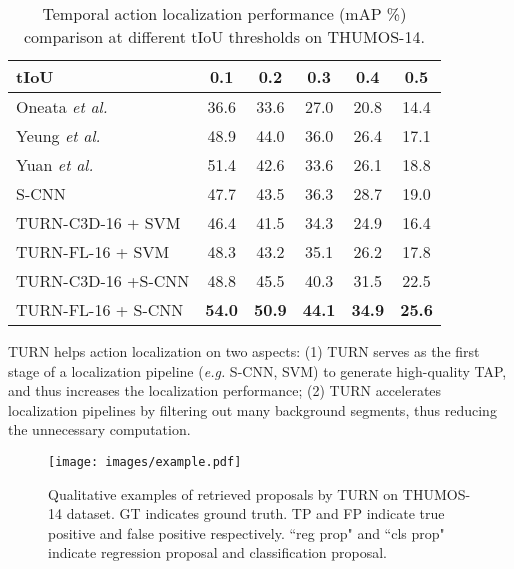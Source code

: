 \documentclass[10pt,twocolumn,letterpaper]{article}
\begin{document}
\begin{table}[h]\small
\centering
\caption{Temporal action localization performance (mAP \%) comparison at different tIoU thresholds on THUMOS-14.}
\label{diff iou tbl}
\begin{tabular}{l|ccccc}
\hline
tIoU     & 0.1           & 0.2           & 0.3           & 0.4           & 0.5           \\ \hline
Oneata \emph{et al.}\cite{oneata2014lear} & 36.6          & 33.6          & 27.0          & 20.8          & 14.4          \\ 
Yeung \emph{et al.}\cite{Yeung_2016_CVPR}  & 48.9          & 44.0          & 36.0          & 26.4          & 17.1          \\ 
Yuan \emph{et al.} \cite{Yuan_2016_CVPR}  & 51.4          & 42.6          & 33.6          & 26.1          & 18.8          \\ 
S-CNN \cite{Shou_2016_CVPR}         & 47.7          & 43.5          & 36.3          & 28.7          & 19.0          \\ \hline
TURN-C3D-16 + SVM            & 46.4      & 41.5          & 34.3          & 24.9          & 16.4       \\ 
TURN-FL-16 + SVM            & 48.3      & 43.2          & 35.1          & 26.2          & 17.8       \\ 
TURN-C3D-16 +S-CNN          & 48.8      & 45.5          & 40.3          & 31.5          & 22.5 \\ 
TURN-FL-16 + S-CNN               & \textbf{54.0} & \textbf{50.9} & \textbf{44.1} & \textbf{34.9} & \textbf{25.6}\\ \hline
\end{tabular}
\end{table}

TURN helps action localization on two aspects: (1) TURN serves as the first stage of a localization pipeline (\emph{e.g.} S-CNN, SVM) to generate high-quality TAP, and thus increases the localization performance; (2) TURN accelerates localization pipelines by filtering out many background segments, thus reducing the unnecessary computation.

\begin{figure}[]

  \centering
    \texttt{[image: images/example.pdf]}
    \caption{Qualitative examples of retrieved proposals by TURN on THUMOS-14 dataset. GT indicates ground truth. TP and FP indicate true positive and false positive respectively. ``reg prop" and ``cls prop" indicate regression proposal and classification proposal.}
      \label{fig:example}
\end{figure}
\end{document}
